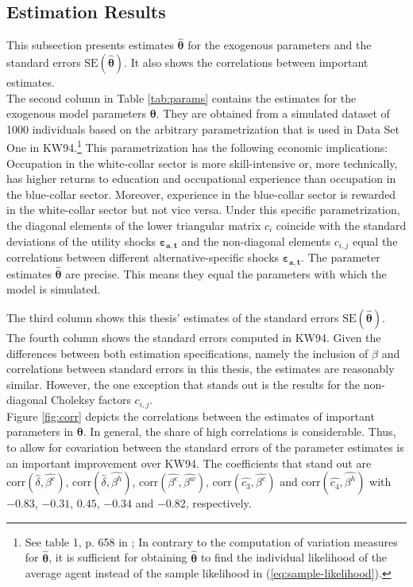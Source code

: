 \subsection{Estimation Results}
This subsection presents estimates $\pmb{\hat{\theta}}$ for the exogenous parameters and the standard errors $\text{SE}(\pmb{\hat{\theta}})$. It also shows the correlations between important estimates.\\
\newline
The second column in Table \ref{tab:params} contains the estimates for the exogenous model parameters $\pmb{\theta}$. They are obtained from a simulated dataset of 1000 individuals based on the arbitrary parametrization that is used in Data Set One in KW94.\footnote{See table 1, p. 658 in \cite{Keane.1994}; In contrary to the computation of variation measures for $\pmb{\hat{\theta}}$, it is sufficient for obtaining $\pmb{\hat{\theta}}$ to find the individual likelihood of the average agent instead of the sample likelihood in (\ref{eq:sample-likelihood}).}
This parametrization has the following economic implications: Occupation in the white-collar sector is more skill-intensive or, more technically, has higher returns to education and occupational experience than occupation in the blue-collar sector. Moreover, experience in the blue-collar sector is rewarded in the white-collar sector but not vice versa.
Under this specific parametrization, the diagonal elements of the lower triangular matrix $c_{i}$ coincide with the standard deviations of the utility shocks $\pmb{\varepsilon_{a,t}}$ and the non-diagonal elements $c_{i,j}$ equal the correlations between different alternative-specific shocks $\pmb{\varepsilon_{a,t}}$.
The parameter estimates $\pmb{\hat{\theta}}$ are precise. This means they equal the parameters with which the model is simulated.

The third column shows this thesis' estimates of the standard errors $\text{SE}(\pmb{\hat{\theta}})$. The fourth column shows the standard errors computed in KW94. Given the differences between both estimation specifications, namely the inclusion of $\beta$ and correlations between standard errors in this thesis, the estimates are reasonably similar. However, the one exception that stands out is the results for the non-diagonal Choleksy factors $c_{i,j}$.\\

\noindent
Figure \ref{fig:corr} depicts the correlations between the estimates of important parameters in $\pmb{\theta}$. In general, the share of high correlations is considerable. Thus, to allow for covariation between the standard errors of the parameter estimates is an important improvement over KW94. The coefficients that stand out are $\text{corr}(\hat{\delta},\hat{\beta^e})$, $\text{corr}(\hat{\delta},\hat{\beta^h})$, $\text{corr}(\hat{\beta^e},\hat{\beta^w})$, $\text{corr}(\hat{c_3},\hat{\beta^e})$ and $\text{corr}(\hat{c_4},\hat{\beta^h})$ with $-0.83$, $-0.31$, $0.45$, $-0.34$ and $-0.82$, respectively. 

